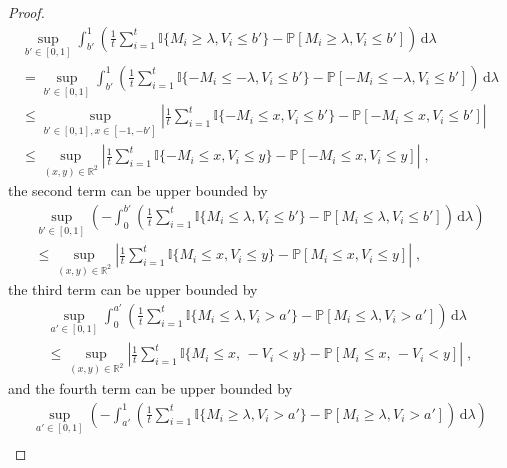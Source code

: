 \documentclass[final,12pt]{colt2025}
\newcommand{\Pb}{\mathbb{P}}
\newcommand{\bbR}{\mathbb{R}}
\newcommand{\lrb}[1]{\left(#1\right)}
\newcommand{\one}[1]{\mathbb{I}\{#1\}}
\newcommand{\labs}[1]{\left\lvert#1\right\rvert}
\newcommand{\dif}{\,\mathrm{d}}
\newcommand{\nP}{M}
\newcommand{\nZ}{V}
\newcommand{\nb}{b}
\newcommand{\ns}{a}
\begin{document}
\begin{proof}
\begin{multline*}
        \sup_{\nb'\in[0,1]} \int_{\nb'}^{1} \lrb{
            \frac{1}{t} \sum_{i=1}^t \one{ \nP_i \ge \lambda, \nZ_i \le \nb' }
            - \Pb[ \nP_i \ge \lambda, \nZ_i \le \nb' ] } \dif\lambda \\
    =
        \sup_{\nb'\in[0,1]} \int_{\nb'}^{1} \lrb{
            \frac{1}{t} \sum_{i=1}^t \one{ -\nP_i \le -\lambda, \nZ_i \le \nb' }
            - \Pb[ -\nP_i \le -\lambda, \nZ_i \le \nb' ] } \dif\lambda \\
    \le
        \sup_{\nb'\in[0,1], x\in[-1,-b']}
            \left| \frac{1}{t} \sum_{i=1}^t \one{ -\nP_i \le x, \nZ_i \le \nb' }
            - \Pb[ -\nP_i \le x, \nZ_i \le \nb' ] \right| \\
    \le
        \sup_{(x,y)\in \bbR^2}
            \left| \frac{1}{t} \sum_{i=1}^t \one{ -\nP_i \le x, \nZ_i \le y }
            - \Pb[ -\nP_i \le x, \nZ_i \le y ] \right| \;,
    \end{multline*}
    the second term can be upper bounded by
    \begin{multline*}
        \sup_{\nb'\in[0,1]} \lrb{
            - \int_{0}^{\nb'} \lrb{
            \frac{1}{t} \sum_{i=1}^t \one{ \nP_i \le \lambda, \nZ_i \le \nb' }
            - \Pb[ \nP_i \le \lambda, \nZ_i \le \nb' ] } \dif\lambda 
        } \\
    \le \sup_{(x,y)\in\bbR^2} \left|
            \frac{1}{t} \sum_{i=1}^t \one{ \nP_i \le x, \nZ_i \le y }
            - \Pb[ \nP_i \le x, \nZ_i \le y ]
        \right| \;,
    \end{multline*}
    the third term can be upper bounded by
    \begin{multline*}
        \sup_{\ns'\in[0,1]}\int_{0}^{\ns'} \lrb{
                \frac{1}{t} \sum_{i=1}^t \one{ \nP_i \le \lambda, \nZ_i > \ns' }
                - \Pb[ \nP_i \le \lambda, \nZ_i > \ns' ]
            } \dif\lambda
    \\
    \le
        \sup_{(x,y)\in\bbR^2 }
        \labs{
                \frac{1}{t} \sum_{i=1}^t \one{ \nP_i \le x, \, - \nZ_i < y }
                - \Pb[ \nP_i \le x, \, - \nZ_i < y ]
            } \;,
    \end{multline*}
    and the fourth term can be upper bounded by
    \begin{multline*}
        \sup_{\ns'\in[0,1]}
        \lrb{
        -
        \int_{\ns'}^{1} \lrb{
                \frac{1}{t} \sum_{i=1}^t \one{ \nP_i \ge \lambda, \nZ_i > \ns' }
                - \Pb[ \nP_i \ge \lambda, \nZ_i > \ns' ]
            } \dif\lambda
        }
    \\

\end{multline*}
\end{proof}
\end{document}
